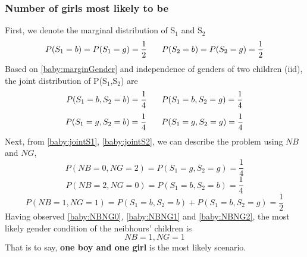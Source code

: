 \documentclass[11pt,a4paper]{article}
\newcommand{\htab}{\hspace*{0.63cm}}
\begin{document}
\subsubsection{Number of girls most likely to be}
\htab First, we denote the marginal distribution of S$_{1}$ and S$_{2}$
    \begin{equation} \label{baby:marginGender}
        P(S_{1} = b) = P(S_{1} = g) = \frac{1}{2} \htab P(S_{2} = b) = P(S_{2} = g) = \frac{1}{2} 
    \end{equation}
\htab Based on \eqref{baby:marginGender} and independence of genders of two children (iid), 
    the joint distribution of P(S$_{1}$,S$_{2}$) are
    \begin{equation}  \label{baby:jointS1}
        P(S_{1} = b, S_{2} = b) = \frac{1}{4} \htab P(S_{1} = b, S_{2} = g) = \frac{1}{4} 
    \end{equation}
    \begin{equation} \label{baby:jointS2}
        P(S_{1} = g, S_{2} = b) = \frac{1}{4} \htab P(S_{1} = g, S_{2} = g) = \frac{1}{4} 
    \end{equation}
\htab Next, from \eqref{baby:jointS1}, \eqref{baby:jointS2}, 
    we can describe the problem using $NB$ and $NG$,
    \begin{equation} \label{baby:NBNG0}
        P(NB = 0, NG = 2) = P(S_{1} = g, S_{2} = g) = \frac{1}{4} 
    \end{equation}
    \begin{equation} \label{baby:NBNG1}
        P(NB = 2, NG = 0) = P(S_{1} = b, S_{2} = b) = \frac{1}{4} 
    \end{equation}
    \begin{equation}  \label{baby:NBNG2}
        P(NB = 1, NG = 1) = P(S_{1} = b, S_{2} = b) + P(S_{1} = b, S_{2} = g) = \frac{1}{2}
    \end{equation}
\htab Having observed \eqref{baby:NBNG0}, \eqref{baby:NBNG1} and \eqref{baby:NBNG2},
    the most likely gender condition of the neibhours' children is
    \begin{equation}
        NB = 1 , NG = 1
    \end{equation}
\htab That is to say, \textbf{one boy and one girl} is the most likely scenario.
%
\end{document}
